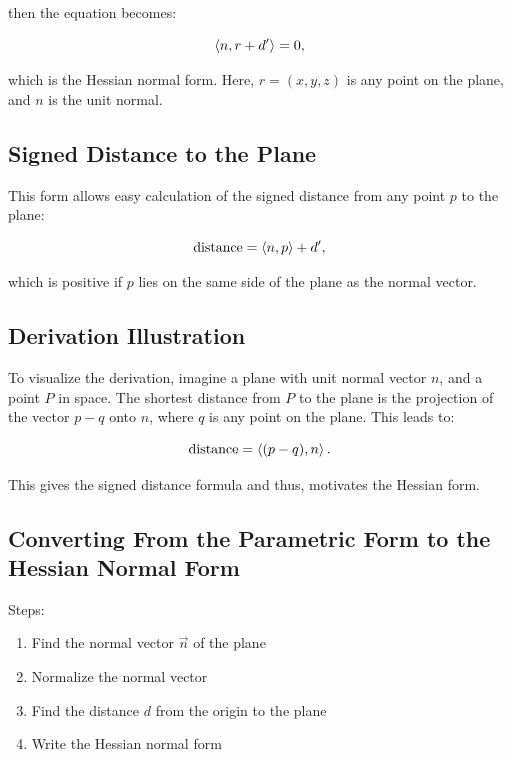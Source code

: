 then the equation becomes:

\[
	\left\langle n,  r + d'\right\rangle = 0,
\]

which is the Hessian normal form. Here, \(r = (x, y, z)\) is any point on the plane, and \(n\) is the unit normal.

\subsection{Signed Distance to the Plane}

This form allows easy calculation of the signed distance from any point \(p\) to the plane:

\[
	\text{distance} = \left\langle n, p\right\rangle + d',
\]

which is positive if \(p\) lies on the same side of the plane as the normal vector.

\subsection{Derivation Illustration}

To visualize the derivation, imagine a plane with unit normal vector \(n\), and a point \(P\) in space. The shortest distance from \(P\) to 
the plane is the projection of the vector \(p - q\) onto \(n\), where \(q\) is any point on the plane. This leads to:

\[
	\text{distance} = \left\langle(p - q), n\right\rangle.
\]

This gives the signed distance formula and thus, motivates the Hessian form.

\subsection{Converting From the Parametric Form to the Hessian Normal Form}

Steps:

\begin{enumerate}

	\item Find the normal vector \(\vec{n}\) of the plane
	
	\item Normalize the normal vector
	
	\item Find the distance \(d\) from the origin to the plane
	
	\item Write the Hessian normal form

\end{enumerate}

